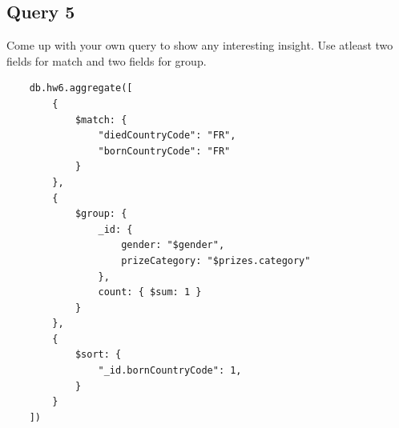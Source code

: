 \documentclass{article}
\begin{document}
\subsection{Query 5}
Come up with your own query to show any interesting insight. Use atleast two
fields for match and two fields for group.

\begin{verbatim}
    db.hw6.aggregate([
        {
            $match: {
                "diedCountryCode": "FR",
                "bornCountryCode": "FR"
            }
        },
        {
            $group: {
                _id: {
                    gender: "$gender",
                    prizeCategory: "$prizes.category"
                },
                count: { $sum: 1 }
            }
        },
        {
            $sort: { 
                "_id.bornCountryCode": 1,
            }
        }
    ])
\end{verbatim}
\end{document}
